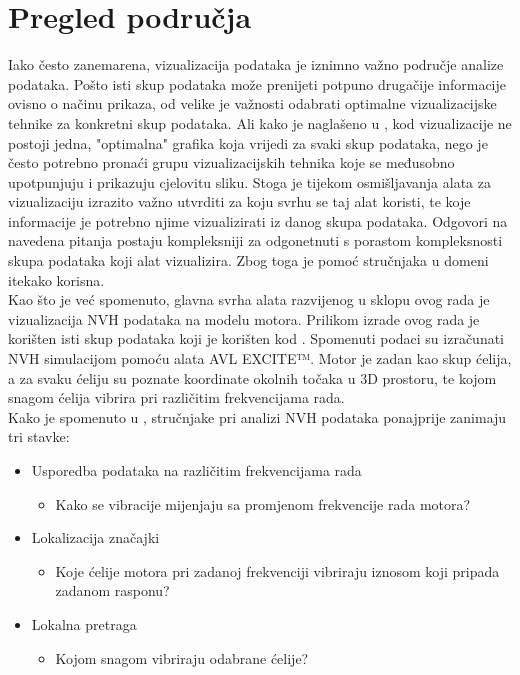 \documentclass[times, utf8, diplomski]{fer}
\begin{document}
\chapter{Pregled područja}
Iako često zanemarena, vizualizacija podataka je iznimno važno područje analize podataka. Pošto isti skup podataka može prenijeti potpuno drugačije informacije ovisno o načinu prikaza, od velike je važnosti odabrati optimalne vizualizacijske tehnike za konkretni skup podataka. Ali kako je naglašeno u \citep{Unwin2020Why}, kod vizualizacije ne postoji jedna, "optimalna" grafika koja vrijedi za svaki skup podataka, nego je često potrebno pronaći grupu vizualizacijskih tehnika koje se međusobno upotpunjuju i prikazuju cjelovitu sliku. Stoga je tijekom osmišljavanja alata za vizualizaciju izrazito važno utvrditi za koju svrhu se taj alat koristi, te koje informacije je potrebno njime vizualizirati iz danog skupa podataka. Odgovori na navedena pitanja postaju kompleksniji za odgonetnuti s porastom kompleksnosti skupa podataka koji alat vizualizira. Zbog toga je pomoć stručnjaka u domeni itekako korisna.\\
Kao što je već spomenuto, glavna svrha alata razvijenog u sklopu ovog rada je vizualizacija NVH podataka na modelu motora. Prilikom izrade ovog rada je korišten isti skup podataka koji je korišten kod \citep{matkovic2021getting}. Spomenuti podaci su izračunati NVH simulacijom pomoću alata AVL EXCITE™\citep{avlEXCITE}. Motor je zadan kao skup ćelija, a za svaku ćeliju su poznate koordinate okolnih točaka u 3D prostoru, te kojom snagom ćelija vibrira pri različitim frekvencijama rada.\\
Kako je spomenuto u \citep{matkovic2021getting}, stručnjake pri analizi NVH podataka ponajprije zanimaju tri stavke:

\begin{itemize}
\item Usporedba podataka na različitim frekvencijama rada
	\begin{itemize}
	\item Kako se vibracije mijenjaju sa promjenom frekvencije rada motora?
	\end{itemize} 
\item Lokalizacija značajki
	\begin{itemize}
	\item Koje ćelije motora pri zadanoj frekvenciji vibriraju iznosom koji pripada zadanom rasponu?
	\end{itemize} 
\item Lokalna pretraga
	\begin{itemize}
	\item Kojom snagom vibriraju odabrane ćelije?
	\end{itemize} 
\end{itemize}
\end{document}
